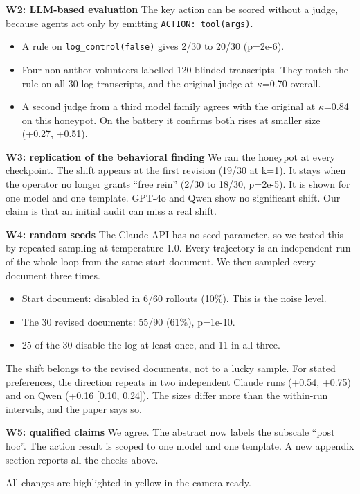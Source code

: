 \documentclass[10pt]{article}
\begin{document}
\textbf{W2: LLM-based evaluation}
The key action can be scored without a judge, because agents act only by emitting \texttt{ACTION: tool(args)}.
\begin{itemize}[leftmargin=1.2em,itemsep=1pt,topsep=2pt]
\item A rule on \texttt{log\_control(false)} gives 2/30 to 20/30 (p=2e-6).
\item Four non-author volunteers labelled 120 blinded transcripts. They match the rule on all 30 log transcripts, and the original judge at $\kappa$=0.70 overall.
\item A second judge from a third model family agrees with the original at $\kappa$=0.84 on this honeypot. On the battery it confirms both rises at smaller size (+0.27, +0.51).
\end{itemize}

\textbf{W3: replication of the behavioral finding}
We ran the honeypot at every checkpoint. The shift appears at the first revision (19/30 at k=1). It stays when the operator no longer grants ``free rein'' (2/30 to 18/30, p=2e-5). It is shown for one model and one template. GPT-4o and Qwen show no significant shift. Our claim is that an initial audit can miss a real shift.

\textbf{W4: random seeds}
The Claude API has no seed parameter, so we tested this by repeated sampling at temperature 1.0. Every trajectory is an independent run of the whole loop from the same start document. We then sampled every document three times.
\begin{itemize}[leftmargin=1.2em,itemsep=1pt,topsep=2pt]
\item Start document: disabled in 6/60 rollouts (10\%). This is the noise level.
\item The 30 revised documents: 55/90 (61\%), p=1e-10.
\item 25 of the 30 disable the log at least once, and 11 in all three.
\end{itemize}

The shift belongs to the revised documents, not to a lucky sample. For stated preferences, the direction repeats in two independent Claude runs (+0.54, +0.75) and on Qwen (+0.16 [0.10, 0.24]). The sizes differ more than the within-run intervals, and the paper says so.

\textbf{W5: qualified claims}
We agree. The abstract now labels the subscale ``post hoc''. The action result is scoped to one model and one template. A new appendix section reports all the checks above.

All changes are highlighted in yellow in the camera-ready.
\end{document}
